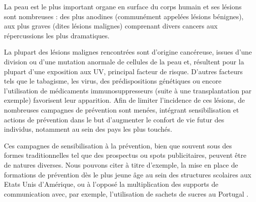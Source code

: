 \renewcommand{\thechapter}{\roman{chapter}}
\setcounter{chapter}{1}
\setcounter{figure}{0}

\label{chap:introduction}
La peau est le plus important organe en surface du corps humain et ses lésions sont nombreuses :  des plus anodines (communément appelées lésions bénignes), aux plus graves (dites lésions malignes) comprenant divers cancers aux répercussions les plus dramatiques.\par

La plupart des lésions malignes rencontrées sont d’origine cancéreuse, issues d’une division ou d’une mutation anormale de cellules de la peau et, résultent pour la plupart d’une exposition aux UV, principal facteur de risque.  D’autres facteurs tels que le tabagisme, les virus, des prédispositions génétiques ou encore l’utilisation de médicaments immunosuppresseurs (suite à une transplantation par exemple) favorisent leur apparition. Afin de limiter l’incidence de ces lésions, de nombreuses campagnes de prévention sont menées, intégrant sensibilisation et actions de prévention dans le but d’augmenter le confort de vie futur des individus, notamment au sein des pays les plus touchés.\par

Ces campagnes de sensibilisation à la prévention, bien que souvent sous des formes traditionnelles tel que des prospectus ou spots publicitaires, peuvent être de natures diverses. Nous pouvons citer à titre d’exemple, la mise en place de formations de prévention dès le plus jeune âge au sein des structures scolaires aux Etats Unis d’Amérique, ou à l’opposé la multiplication des supports de communication avec, par exemple, l’utilisation de sachets de sucres au Portugal \cite{Correia2017,Guy2016}.\par 


